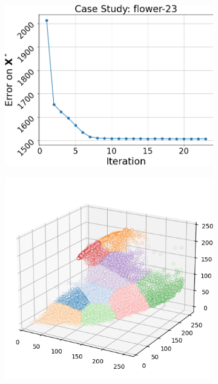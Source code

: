 \begin{figure}[htbp]
\begin{subfigure}[t]{0.32\textwidth}
    \end{subfigure}
    \begin{subfigure}[t]{0.32\textwidth}
        \includegraphics[width=\linewidth]{../../python_code/plots/kmeans/flower-23/elbow_curve.png}
    \end{subfigure}
    \begin{subfigure}[t]{0.32\textwidth}
        \includegraphics[width=\linewidth]{../../python_code/plots/kmeans/flower-23/clusters_elev20_azim-60.png}

\end{subfigure}
\end{figure}

